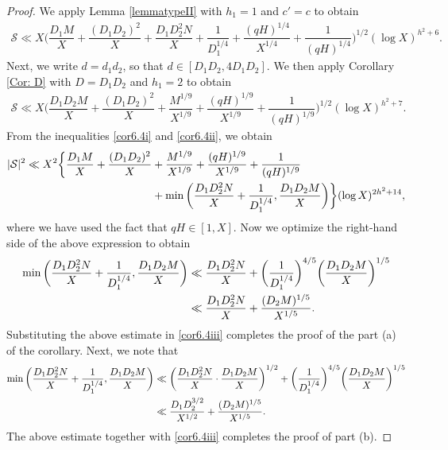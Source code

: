\documentclass[12pt]{amsart}
\numberwithin{equation}{section}
\theoremstyle{remark}
\theoremstyle{definition}
\begin{document}
\begin{proof}
 We apply Lemma \ref{lemmatypeII} with $h_1=1$ and $c'=c$ to obtain
\begin{align}\label{cor6.4i}
\mathcal{S} \ll X\bigg(\dfrac{D_1M}{X} + \dfrac{(D_1D_2)^2}{X} + \dfrac{D_1D_2^2N}{X} + \dfrac{1}{D_1^{1/4}} + \dfrac{(qH)^{1/4}}{X^{1/4}} + \dfrac{1}{(qH)^{1/4}}\bigg)^{1/2}(\log X)^{h^2+6}.
\end{align}
Next, we write $d=d_1d_2$, so that $d\in [D_1D_2, 4D_1D_2]$. We then apply Corollary \ref{Cor: D} with $D=D_1D_2$ and $h_1=2$ to obtain
\begin{align}\label{cor6.4ii}
\mathcal{S} \ll X\bigg(\dfrac{D_1D_2M}{X} + \dfrac{(D_1D_2)^2}{X} + \dfrac{M^{1/9}}{X^{1/9}} + \dfrac{(qH)^{1/9}}{X^{1/9}} + \dfrac{1}{(qH)^{1/9}}\bigg)^{1/2}(\log X)^{h^2+7}.
\end{align}
From the inequalities \eqref{cor6.4i} and \eqref{cor6.4ii}, we obtain
\begin{align}
\notag|\mathcal{S}|^2 \ll X^2\bigg\{\dfrac{D_1M}{X} + \dfrac{(D_1D_2)^2}{X}&+ \dfrac{M^{1/9}}{X^{1/9}} + \dfrac{(qH)^{1/9}}{X^{1/9}} + \dfrac{1}{(qH)^{1/9}} \\
\label{cor6.4iii}& + \min\bigg(\dfrac{D_1D_2^2N}{X} + \dfrac{1}{D_1^{1/4}}, \dfrac{D_1D_2M}{X}\bigg)\bigg\}(\log X)^{2h^2+14},
\end{align}
where we have used the fact that $qH \in [1, X]$. Now we optimize the right-hand side of the above expression to obtain
\begin{align}\notag 
 \min\bigg(\dfrac{D_1D_2^2N}{X} + \dfrac{1}{D_1^{1/4}}, \dfrac{D_1D_2M}{X}\bigg)  &\ll \dfrac{D_1D_2^2N}{X} + \bigg(\dfrac{1}{D_1^{1/4}}\bigg)^{4/5}\bigg(\dfrac{D_1D_2M}{X}\bigg)^{1/5}\\
 \notag &\ll \dfrac{D_1D_2^2N}{X} + \dfrac{(D_2M)^{1/5}}{X^{1/5}}.
\end{align} Substituting the above estimate in \eqref{cor6.4iii} completes the proof of the part (a) of the corollary. Next, we note that
\begin{align}\notag 
 \min\bigg(\dfrac{D_1D_2^2N}{X} + \dfrac{1}{D_1^{1/4}}, \dfrac{D_1D_2M}{X}\bigg)  &\ll \bigg(\dfrac{D_1D_2^2N}{X}\cdot \dfrac{D_1D_2M}{X}\bigg)^{1/2} + \bigg(\dfrac{1}{D_1^{1/4}}\bigg)^{4/5}\bigg(\dfrac{D_1D_2M}{X}\bigg)^{1/5}\\
 \notag &\ll \dfrac{D_1D_2^{3/2}}{X^{1/2}} + \dfrac{(D_2M)^{1/5}}{X^{1/5}}.
\end{align}
The above estimate together with \eqref{cor6.4iii} completes the proof of part (b).
\end{proof}
\end{document}
